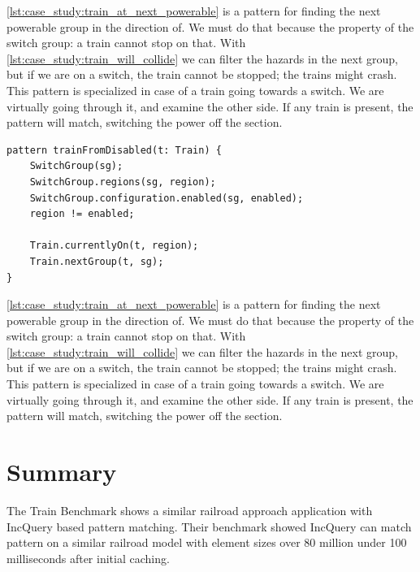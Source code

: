 \cref{lst:case_study:train_at_next_powerable} is a pattern for finding the next powerable group in the direction of. We must do that because the property of the switch group: a train cannot stop on that. With \cref{lst:case_study:train_will_collide} we can filter the hazards in the next group, but if we are on a switch, the train cannot be stopped; the trains might crash. This pattern is specialized in case of a train going towards a switch. We are virtually going through it, and examine the other side. If any train is present, the pattern will match, switching the power off the section.
\\[1ex]

\begin{lstlisting}[caption={Collision detection},label=lst:case_study:train_at_next_powerable]
pattern trainFromDisabled(t: Train) {
	SwitchGroup(sg);
	SwitchGroup.regions(sg, region);
	SwitchGroup.configuration.enabled(sg, enabled);
	region != enabled;
	
	Train.currentlyOn(t, region);
	Train.nextGroup(t, sg);
}
\end{lstlisting}

\cref{lst:case_study:train_at_next_powerable} is a pattern for finding the next powerable group in the direction of. We must do that because the property of the switch group: a train cannot stop on that. With \cref{lst:case_study:train_will_collide} we can filter the hazards in the next group, but if we are on a switch, the train cannot be stopped; the trains might crash. This pattern is specialized in case of a train going towards a switch. We are virtually going through it, and examine the other side. If any train is present, the pattern will match, switching the power off the section.

\section{Summary}

The Train Benchmark\cite{TrainBenchmark} shows a similar railroad approach application with IncQuery based pattern matching. Their benchmark showed IncQuery can match pattern on a similar railroad model with element sizes over 80 million under 100 milliseconds after initial caching.